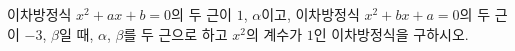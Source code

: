 이차방정식 $x^2+ax+b=0$의 두 근이 $1$, $\alpha$이고, 이차방정식 $x^2+bx+a=0$의 두 근이 $-3$, $\beta$일 때, $\alpha$, $\beta$를 두 근으로 하고 $x^2$의 계수가 $1$인 이차방정식을 구하시오. 
